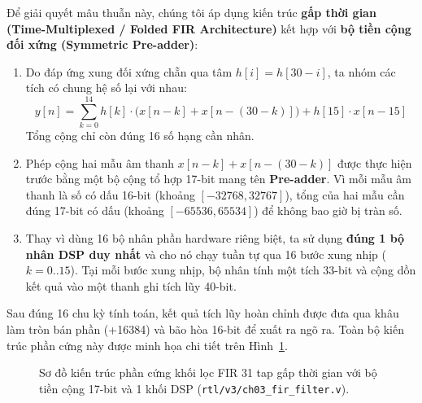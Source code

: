 Để giải quyết mâu thuẫn này, chúng tôi áp dụng kiến trúc \textbf{gấp thời gian (Time-Multiplexed / Folded FIR Architecture)} kết hợp với \textbf{bộ tiền cộng đối xứng (Symmetric Pre-adder)}:
\begin{enumerate}[leftmargin=1.5em, itemsep=2pt]
    \item Do đáp ứng xung đối xứng chẵn qua tâm $h[i] = h[30 - i]$, ta nhóm các tích có chung hệ số lại với nhau:
    \begin{equation}
    y[n] = \sum_{k=0}^{14} h[k] \cdot \big(x[n - k] + x[n - (30 - k)]\big) + h[15] \cdot x[n - 15]
    \end{equation}
    Tổng cộng chỉ còn đúng 16 số hạng cần nhân.
    \item Phép cộng hai mẫu âm thanh $x[n-k] + x[n-(30-k)]$ được thực hiện trước bằng một bộ cộng tổ hợp 17-bit mang tên \textbf{Pre-adder}. Vì mỗi mẫu âm thanh là số có dấu 16-bit (khoảng $[-32768, 32767]$), tổng của hai mẫu cần đúng 17-bit có dấu (khoảng $[-65536, 65534]$) để không bao giờ bị tràn số.
    \item Thay vì dùng 16 bộ nhân phần hardware riêng biệt, ta sử dụng \textbf{đúng 1 bộ nhân DSP duy nhất} và cho nó chạy tuần tự qua 16 bước xung nhịp ($k = 0..15$). Tại mỗi bước xung nhịp, bộ nhân tính một tích 33-bit và cộng dồn kết quả vào một thanh ghi tích lũy 40-bit.
\end{enumerate}

Sau đúng 16 chu kỳ tính toán, kết quả tích lũy hoàn chỉnh được đưa qua khâu làm tròn bán phần (+16384) và bão hòa 16-bit để xuất ra ngõ ra. Toàn bộ kiến trúc phần cứng này được minh họa chi tiết trên Hình~\ref{fig:ch03_folded_arch}.

\begin{figure}[htbp]
\centering
\resizebox{\textwidth}{!}{}
\caption{Sơ đồ kiến trúc phần cứng khối lọc FIR 31 tap gấp thời gian với bộ tiền cộng 17-bit và 1 khối DSP (\texttt{rtl/v3/ch03\_fir\_filter.v}).}
\label{fig:ch03_folded_arch}
\end{figure}

